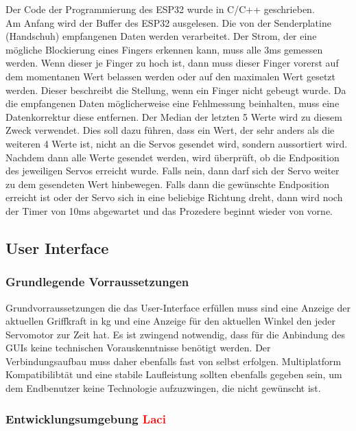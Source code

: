 \documentclass[titlepage,12pt,twoside]{article}
\begin{document}
Der Code der Programmierung des ESP32 wurde in C/C++ geschrieben. \\
Am Anfang wird der Buffer des ESP32 ausgelesen. Die von der Senderplatine (Handschuh) empfangenen Daten werden verarbeitet. 
Der Strom, der eine mögliche Blockierung eines Fingers erkennen kann, muss alle 3ms gemessen werden. Wenn dieser je Finger zu 
hoch ist, dann muss dieser Finger vorerst auf dem momentanen Wert belassen werden oder auf den maximalen Wert gesetzt werden. 
Dieser beschreibt die Stellung, wenn ein Finger nicht gebeugt wurde. Da die empfangenen Daten möglicherweise eine Fehlmessung 
beinhalten, muss eine Datenkorrektur diese entfernen. Der Median der letzten 5 Werte wird zu diesem Zweck verwendet. Dies soll 
dazu führen, dass ein Wert, der sehr anders als die weiteren 4 Werte ist, nicht an die Servos gesendet wird, sondern aussortiert 
wird. Nachdem dann alle Werte gesendet werden, wird überprüft, ob die Endposition des jeweiligen Servos erreicht wurde. Falls 
nein, dann darf sich der Servo weiter zu dem gesendeten Wert hinbewegen. Falls dann die gewünschte Endposition erreicht ist 
oder der Servo sich in eine beliebige Richtung dreht, dann wird noch der Timer von 10ms abgewartet und das Prozedere beginnt 
wieder von vorne.
\\

\subsection{User Interface}

\subsubsection{Grundlegende Vorraussetzungen}
Grundvorraussetzungen die das User-Interface erfüllen muss sind eine Anzeige der aktuellen Griffkraft in kg und eine Anzeige für
den aktuellen Winkel den jeder Servomotor zur Zeit hat. Es ist zwingend notwendig, dass für die Anbindung des GUIs keine technischen
Vorauskenntnisse benötigt werden. Der Verbindungsaufbau muss daher ebenfalls fast von selbst erfolgen. Multiplatform Kompatibilibtät
und eine stabile Laufleistung sollten ebenfalls gegeben sein, um dem Endbenutzer keine Technologie aufzuzwingen, die nicht gewünscht ist.

\subsubsection{Entwicklungsumgebung \textcolor{red}{Laci}}
\end{document}
